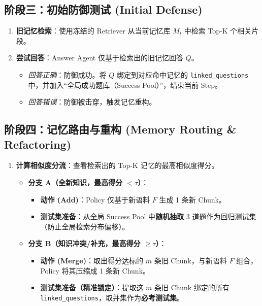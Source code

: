 \documentclass[a4paper,11pt]{article}
\begin{document}
\subsection*{阶段三：初始防御测试 (Initial Defense)}
\begin{enumerate}[resume]
    \item \textbf{旧记忆检索}：使用冻结的 Retriever 从当前记忆库 \(M_t\) 中检索 Top-K 个相关片段。
    \item \textbf{尝试回答}：Answer Agent 仅基于检索出的旧记忆回答 \(Q\)。
    \begin{itemize}
        \item \textit{回答正确}：防御成功。将 \(Q\) 绑定到对应命中记忆的 \texttt{linked\_questions} 中，并加入“全局成功题库（Success Pool）”，结束当前 Step。
        \item \textit{回答错误}：防御被击穿，触发记忆重构。
    \end{itemize}
\end{enumerate}

\subsection*{阶段四：记忆路由与重构 (Memory Routing \& Refactoring)}
\begin{enumerate}[resume]
    \item \textbf{计算相似度分流}：查看检索出的 Top-K 记忆的最高相似度得分。
    \begin{itemize}
        \item \textbf{分支 A（全新知识，最高得分 \(< \tau\)）}：
        \begin{itemize}
            \item \textbf{动作 (Add)}：Policy 仅基于新语料 \(F\) 生成 1 条新 Chunk。
            \item \textbf{测试集准备}：从全局 Success Pool 中\textbf{随机抽取} 3 道题作为回归测试集（防止全局检索分布偏移）。
        \end{itemize}
        \item \textbf{分支 B（知识冲突/补充，最高得分 \(\ge \tau\)）}：
        \begin{itemize}
            \item \textbf{动作 (Merge)}：取出得分达标的 \(m\) 条旧 Chunk，与新语料 \(F\) 组合，Policy 将其压缩成 1 条新 Chunk。
            \item \textbf{测试集准备（精准锁定）}：提取这 \(m\) 条旧 Chunk 绑定的所有 \texttt{linked\_questions}，取并集作为\textbf{必考测试集}。
        \end{itemize}
    \end{itemize}
\end{enumerate}
\end{document}
